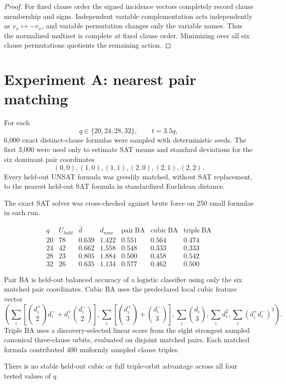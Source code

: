 \documentclass[11pt]{article}
\begin{document}
\begin{proof}
For fixed clause order the signed incidence vectors completely record clause
membership and signs. Independent variable complementation acts independently
as \(v_x\mapsto-v_x\), and variable permutation changes only the variable
names. Thus the normalized multiset is complete at fixed clause order.
Minimizing over all six clause permutations quotients the remaining action.
\end{proof}

\section{Experiment A: nearest pair matching}

For each
\[
q\in\{20,24,28,32\},\qquad t=3.5q,
\]
6,000 exact distinct-clause formulas were sampled with deterministic seeds.
The first 3,000 were used only to estimate SAT means and standard deviations
for the six dominant pair coordinates
\[
(0,0),(1,0),(1,1),(2,0),(2,1),(2,2).
\]
Every held-out UNSAT formula was greedily matched, without SAT replacement, to
the nearest held-out SAT formula in standardized Euclidean distance.

The exact SAT solver was cross-checked against brute force on 250 small
formulas in each run.

\[
\begin{array}{c|c|c|c|c|c|c}
q&U_{hold}&\bar d&d_{max}&
\mathrm{pair\ BA}&\mathrm{cubic\ BA}&\mathrm{triple\ BA}\\
\hline
20&78&0.639&1.422&0.551&0.564&0.474\\
24&42&0.662&1.558&0.548&0.333&0.333\\
28&23&0.805&1.884&0.500&0.458&0.542\\
32&26&0.635&1.134&0.577&0.462&0.500
\end{array}
\]

Pair BA is held-out balanced accuracy of a logistic classifier using only the
six matched pair coordinates. Cubic BA uses the predeclared local cubic feature
vector
\[
\left(
\sum_i\left[\binom{d_i^+}{2}d_i^-+d_i^+\binom{d_i^-}{2}\right],
\sum_i\left[\binom{d_i^+}{3}+\binom{d_i^-}{3}\right],
\sum_i\binom{d_i}{3},
\sum_i d_i^2,
\sum_i(d_i^+d_i^-)^2
\right).
\]
Triple BA uses a discovery-selected linear score from the eight strongest
sampled canonical three-clause orbits, evaluated on disjoint matched pairs.
Each matched formula contributed 400 uniformly sampled clause triples.

There is no stable held-out cubic or full triple-orbit advantage across all
four tested values of \(q\).
\end{document}
